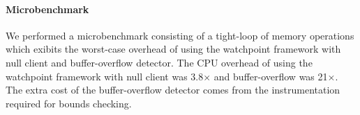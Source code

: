 \documentclass[letterpaper,twocolumn,10pt]{article}
\begin{document}


\paragraph{Microbenchmark} We performed a microbenchmark consisting of a tight-loop of memory operations which exibits the worst-case overhead of using the watchpoint framework with null client and buffer-overflow detector. The CPU overhead of using the watchpoint framework with null client was 3.8{\footnotesize$\times$} and buffer-overflow was 21{\footnotesize$\times$}. The extra cost of the buffer-overflow detector comes from the instrumentation required for bounds checking.









\end{document}
